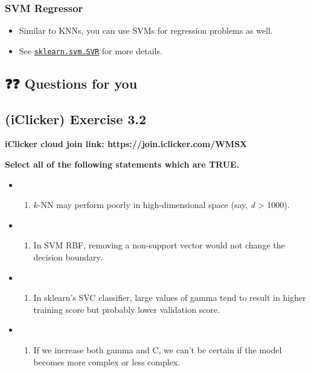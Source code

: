 \documentclass[11pt]{article}
\providecommand{\tightlist}{%
      \setlength{\itemsep}{0pt}\setlength{\parskip}{0pt}}
\begin{document}
    \subsubsection{SVM Regressor}\label{svm-regressor}

\begin{itemize}
\tightlist
\item
  Similar to KNNs, you can use SVMs for regression problems as well.
\item
  See
  \href{https://scikit-learn.org/stable/modules/generated/sklearn.svm.SVR.html}{\texttt{sklearn.svm.SVR}}
  for more details.
\end{itemize}

    \subsection{❓❓ Questions for you}\label{questions-for-you}

    \subsection{(iClicker) Exercise 3.2}\label{iclicker-exercise-3.2}

\textbf{iClicker cloud join link: https://join.iclicker.com/WMSX}

\textbf{Select all of the following statements which are TRUE.}

\begin{itemize}
\tightlist
\item
  \begin{enumerate}
  \def\labelenumi{(\Alph{enumi})}
  \tightlist
  \item
    \(k\)-NN may perform poorly in high-dimensional space (say, \emph{d}
    \textgreater{} 1000).
  \end{enumerate}
\item
  \begin{enumerate}
  \def\labelenumi{(\Alph{enumi})}
  \setcounter{enumi}{1}
  \tightlist
  \item
    In SVM RBF, removing a non-support vector would not change the
    decision boundary.
  \end{enumerate}
\item
  \begin{enumerate}
  \def\labelenumi{(\Alph{enumi})}
  \setcounter{enumi}{2}
  \tightlist
  \item
    In sklearn's SVC classifier, large values of gamma tend to result in
    higher training score but probably lower validation score.
  \end{enumerate}
\item
  \begin{enumerate}
  \def\labelenumi{(\Alph{enumi})}
  \setcounter{enumi}{3}
  \tightlist
  \item
    If we increase both gamma and C, we can't be certain if the model
    becomes more complex or less complex.
  \end{enumerate}
\end{itemize}
\end{document}
